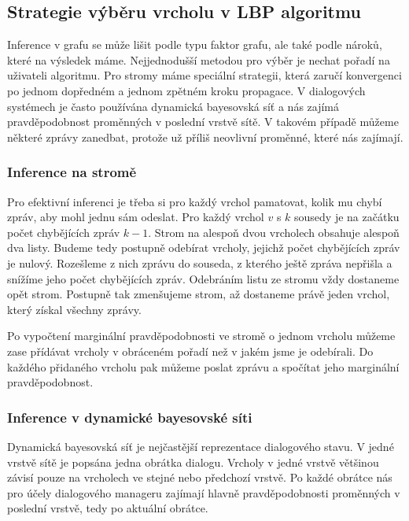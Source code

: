 \subsection{Strategie výběru vrcholu v LBP algoritmu}

Inference v grafu se může lišit podle typu faktor grafu, ale také podle nároků, které na výsledek máme.
Nejjednodušší metodou pro výběr je nechat pořadí na uživateli algoritmu.
Pro stromy máme speciální strategii, která zaručí konvergenci po jednom dopředném a jednom zpětném kroku propagace.
V dialogových systémech je často používána dynamická bayesovská síť a nás zajímá pravděpodobnost proměnných v poslední vrstvě sítě.
V takovém případě můžeme některé zprávy zanedbat, protože už příliš neovlivní proměnné, které nás zajímají.

\subsubsection{Inference na stromě}

Pro efektivní inferenci je třeba si pro každý vrchol pamatovat, kolik mu chybí zpráv, aby mohl jednu sám odeslat.
Pro každý vrchol $v$ s $k$ sousedy je na začátku počet chybějících zpráv $k-1$.
Strom na alespoň dvou vrcholech obsahuje alespoň dva listy.
Budeme tedy postupně odebírat vrcholy, jejichž počet chybějících zpráv je nulový.
Rozešleme z nich zprávu do souseda, z kterého ještě zpráva nepřišla a snížíme jeho počet chybějících zpráv.
Odebráním listu ze stromu vždy dostaneme opět strom.
Postupně tak zmenšujeme strom, až dostaneme právě jeden vrchol, který získal všechny zprávy.

Po vypočtení marginální pravděpodobnosti ve stromě o jednom vrcholu můžeme zase přídávat vrcholy v obráceném pořadí než v jakém jsme je odebírali.
Do každého přidaného vrcholu pak můžeme poslat zprávu a spočítat jeho marginální pravděpodobnost.

\subsubsection{Inference v dynamické bayesovské síti}

Dynamická bayesovská síť je nejčastější reprezentace dialogového stavu.
V jedné vrstvě sítě je popsána jedna obrátka dialogu.
Vrcholy v jedné vrstvě většinou závisí pouze na vrcholech ve stejné nebo předchozí vrstvě.
Po každé obrátce nás pro účely dialogového manageru zajímají hlavně pravděpodobnosti proměnných v poslední vrstvě, tedy po aktuální obrátce.

